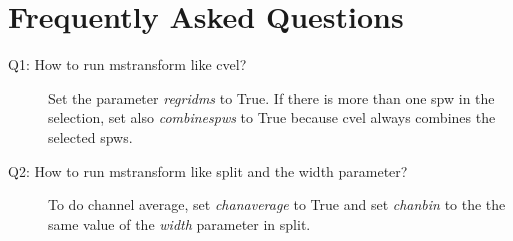 \begin{enumerate}
\end{enumerate}

\section{Frequently Asked Questions}\label{Sec:FAQ}
\begin{description}
  \item[Q1: How to run mstransform like cvel?] \hfill 
  Set the parameter {\it regridms} to True. If there is more than one spw in the
selection, set also {\it combinespws} to True because cvel always combines the selected
spws.

  \item[Q2: How to run mstransform like split and the width parameter?] \hfill 
  To do channel average, set {\it chanaverage} to True and set {\it chanbin} to the
  the same value of the {\it width} parameter in split.

\end{description}

